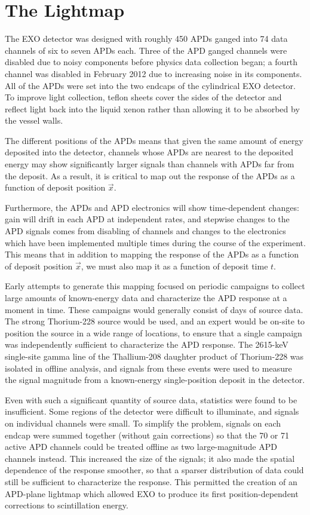 
\renewcommand{\thechapter}{5}
\chapter{The Lightmap}
\label{ch:Lightmap}

The EXO detector was designed with roughly 450 APDs ganged into 74 data channels of six to seven APDs each. Three of the APD ganged channels were disabled due to noisy components before physics data collection began; a fourth channel was disabled in February 2012 due to increasing noise in its components.  All of the APDs were set into the two endcaps of the cylindrical EXO detector.  To improve light collection, teflon sheets cover the sides of the detector and reflect light back into the liquid xenon rather than allowing it to be absorbed by the vessel walls.

The different positions of the APDs means that given the same amount of energy deposited into the detector, channels whose APDs are nearest to the deposited energy may show significantly larger signals than channels with APDs far from the deposit.   As a result, it is critical to map out the response of the APDs as a function of deposit position $\vec{x}$.

Furthermore, the APDs and APD electronics will show time-dependent changes: gain will drift in each APD at independent rates, and stepwise changes to the APD signals comes from disabling of channels and changes to the electronics which have been implemented multiple times during the course of the experiment.  This means that in addition to mapping the response of the APDs as a function of deposit position $\vec{x}$, we must also map it as a function of deposit time $t$.

Early attempts to generate this mapping focused on periodic campaigns to collect large amounts of known-energy data and characterize the APD response at a moment in time.  These campaigns would generally consist of days of source data.  The strong Thorium-228 source would be used, and an expert would be on-site to position the source in a wide range of locations, to ensure that a single campaign was independently sufficient to characterize the APD response.  The 2615-keV single-site gamma line of the Thallium-208 daughter product of Thorium-228 was isolated in offline analysis, and signals from these events were used to measure the signal magnitude from a known-energy single-position deposit in the detector.

Even with such a significant quantity of source data, statistics were found to be insufficient.  Some regions of the detector were difficult to illuminate, and signals on individual channels were small.  To simplify the problem, signals on each endcap were summed together (without gain corrections) so that the 70 or 71 active APD channels could be treated offline as two large-magnitude APD channels instead.  This increased the size of the signals; it also made the spatial dependence of the response smoother, so that a sparser distribution of data could still be sufficient to characterize the response.  This permitted the creation of an APD-plane lightmap which allowed EXO to produce its first position-dependent corrections to scintillation energy.~\cite{ThesisSteve}

